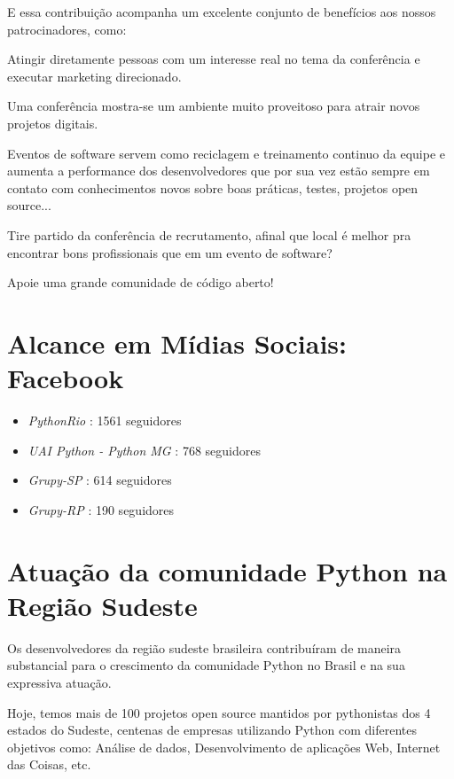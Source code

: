 \documentclass[12pt]{article}
\begin{document}
E essa contribuição acompanha um excelente conjunto de benefícios aos nossos patrocinadores, como:
\begin{description}[align=right,labelwidth=4cm]
    \item [Visibilidade:] Atingir diretamente pessoas com um interesse real no tema da conferência e executar marketing direcionado.
    \item [Oportunidades:] Uma conferência mostra-se um ambiente muito proveitoso para atrair novos projetos digitais.
    \item [Produtividade:] Eventos de software servem como reciclagem e treinamento continuo da equipe e aumenta a performance dos desenvolvedores que por sua vez estão sempre em contato com conhecimentos novos sobre boas práticas, testes, projetos open source...
    \item [Contratação:] Tire partido da conferência de recrutamento, afinal que local é melhor pra encontrar bons profissionais que em um evento de software?
    \item [Patrocínio:] Apoie uma grande comunidade de código aberto!
\end{description}

\section{Alcance em Mídias Sociais: Facebook}
\begin{itemize}[label={}]
    \item \emph{PythonRio} : 1561 seguidores
    \item \emph{UAI Python - Python MG } : 768 seguidores
    \item \emph{Grupy-SP} :  614 seguidores
    \item \emph{Grupy-RP} : 190 seguidores
\end{itemize}

\section{Atuação da comunidade Python na Região Sudeste}

Os desenvolvedores da região sudeste brasileira contribuíram de maneira substancial para o crescimento da comunidade Python no Brasil e na sua expressiva atuação. 

Hoje, temos mais de 100 projetos open source mantidos por pythonistas dos 4 estados do Sudeste, centenas de empresas utilizando Python com diferentes objetivos como: Análise de dados, Desenvolvimento de aplicações Web, Internet das Coisas, etc.
\end{document}
